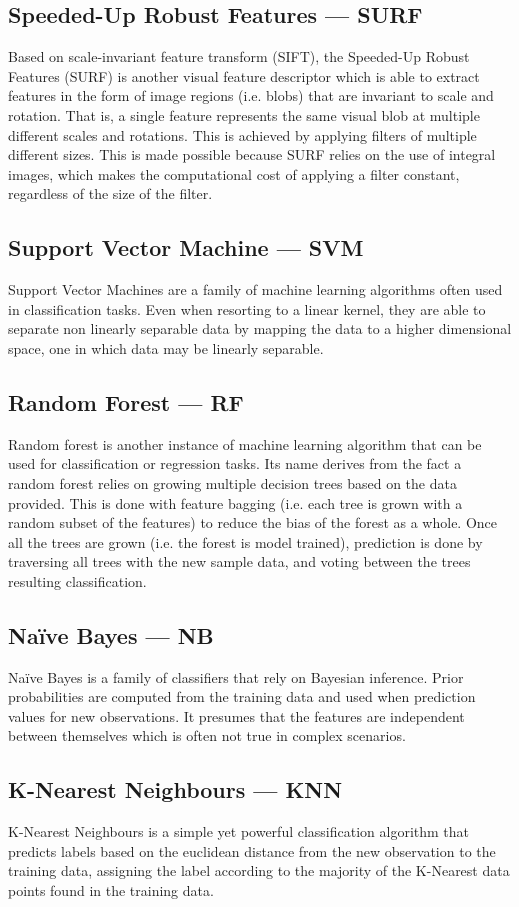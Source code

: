 \documentclass[11pt]{article}
\begin{document}
    \subsection{Speeded-Up Robust Features --- SURF}
        Based on scale-invariant feature transform (SIFT), the Speeded-Up Robust Features (SURF) is another visual feature descriptor which is able to extract features in the form of image regions (i.e. blobs) that are invariant to scale and rotation. That is, a single feature represents the same visual blob at multiple different scales and rotations. This is achieved by applying filters of multiple different sizes. This is made possible because SURF relies on the use of integral images, which makes the computational cost of applying a filter constant, regardless of the size of the filter.
    \subsection{Support Vector Machine --- SVM}
        Support Vector Machines are a family of machine learning algorithms often used in classification tasks. Even when resorting to a linear kernel, they are able to separate non linearly separable data by mapping the data to a higher dimensional space, one in which data may be linearly separable.
    \subsection{Random Forest --- RF}
        Random forest is another instance of machine learning algorithm that can be used for classification or regression tasks. Its name derives from the fact a random forest relies on growing multiple decision trees based on the data provided. This is done with feature bagging (i.e. each tree is grown with a random subset of the features) to reduce the bias of the forest as a whole. Once all the trees are grown (i.e. the forest is model trained), prediction is done by traversing all trees with the new sample data, and voting between the trees resulting classification.
    \subsection{Naïve Bayes --- NB}
        Naïve Bayes is a family of classifiers that rely on Bayesian inference. Prior probabilities are computed from the training data and used when prediction values for new observations. It presumes that the features are independent between themselves which is often not true in complex scenarios.
    \subsection{K-Nearest Neighbours --- KNN}
        K-Nearest Neighbours is a simple yet powerful classification algorithm that predicts labels based on the euclidean distance from the new observation to the training data, assigning the label according to the majority of the K-Nearest data points found in the training data.
\end{document}
